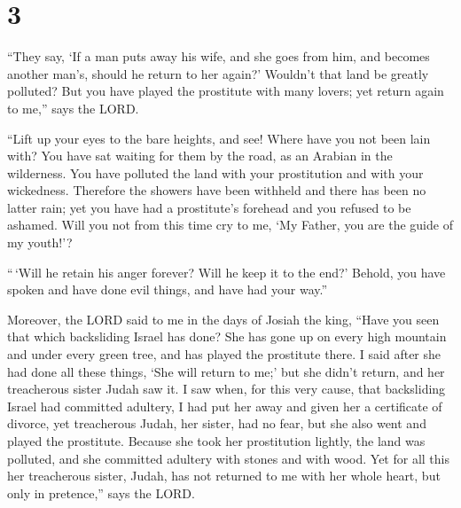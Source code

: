 \hypertarget{section-2}{%
\section{3}\label{section-2}}

 ``They say, `If a man puts away his wife, and she goes
from him, and becomes another man's, should he return to her again?'
Wouldn't that land be greatly polluted? But you have played the
prostitute with many lovers; yet return again to me,'' says the LORD.

 ``Lift up your eyes to the bare heights, and see! Where
have you not been lain with? You have sat waiting for them by the road,
as an Arabian in the wilderness. You have polluted the land with your
prostitution and with your wickedness.  Therefore the
showers have been withheld and there has been no latter rain; yet you
have had a prostitute's forehead and you refused to be ashamed.
 Will you not from this time cry to me, `My Father, you
are the guide of my youth!'?

 ``\,`Will he retain his anger forever? Will he keep it to
the end?' Behold, you have spoken and have done evil things, and have
had your way.''

 Moreover, the LORD said to me in the days of Josiah the
king, ``Have you seen that which backsliding Israel has done? She has
gone up on every high mountain and under every green tree, and has
played the prostitute there.  I said after she had done
all these things, `She will return to me;' but she didn't return, and
her treacherous sister Judah saw it.  I saw when, for this
very cause, that backsliding Israel had committed adultery, I had put
her away and given her a certificate of divorce, yet treacherous Judah,
her sister, had no fear, but she also went and played the prostitute.
 Because she took her prostitution lightly, the land was
polluted, and she committed adultery with stones and with wood.
 Yet for all this her treacherous sister, Judah, has not
returned to me with her whole heart, but only in pretence,'' says the
LORD.

